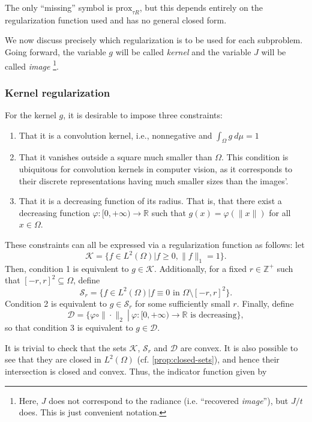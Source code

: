 \documentclass[twocolumn,twoside,a4paper,10pt]{IEEEtran}
\begin{document}
The only ``missing'' symbol is \(\text{prox}_{\tau R}\), but this depends entirely on the regularization function used and has no general closed form.

We now discuss precisely which regularization is to be used for each subproblem. Going forward, the variable \(g\) will be called \textit{kernel} and the variable \(J\) will be called \textit{image} \footnote{Here, \(J\) does not correspond to the radiance (i.e. ``recovered \textit{image}''), but \(J/t\) does. This is just convenient notation.}.

\subsubsection{Kernel regularization}
For the kernel \(g\), it is desirable to impose three constraints:
\begin{enumerate}
  \item \label{kernel-regularization-1}That it is a convolution kernel, i.e., nonnegative and \(\int_{\Omega}g~d\mu = 1\)
  \item That it vanishes outside a square much smaller than \(\Omega\). This condition is ubiquitous for convolution kernels in computer vision, as it corresponds to their discrete representations having much smaller sizes than the images'.
  \item That it is a decreasing function of its radius. That is, that there exist a decreasing function \(\varphi\colon [0, +\infty)\to \mathbb{R}\) such that \(g(x)=\varphi(\|x\|)\) for all \(x\in\Omega\).
\end{enumerate}

These constraints can all be expressed via a regularization function as follows: let \[\mathcal{K}=\{f\in L^2(\Omega) | f\geq 0, \|f\|_{1}=1\}.\] Then, condition 1 is equivalent to \(g\in \mathcal{K}\). Additionally, for a fixed \(r\in\mathbb{Z}^+\) such that \([-r, r]^2\subseteq\Omega\), define \[\mathcal{S}_r = \{f\in L^2(\Omega) | f\equiv 0 \text{~in~} \Omega\setminus [-r, r]^2\}.\] Condition 2 is equivalent to \(g\in \mathcal{S}_r\) for some sufficiently small \(r\). Finally, define \[\mathcal{D}=\{\left.\varphi\circ\|\cdot\|_{2} ~\right|~ \varphi\colon[0,+\infty)\to \mathbb{R} \text{ is decreasing}\},\] so that condition 3 is equivalent to \(g\in \mathcal{D}\).

It is trivial to check that the sets \(\mathcal{K}\), \(\mathcal{S}_r\) and \(\mathcal{D}\) are convex. It is also possible to see that they are closed in \(L^2(\Omega)\) (cf. \cref{prop:closed-sets}), and hence their intersection is closed and convex. Thus, the indicator function given by
\end{document}

